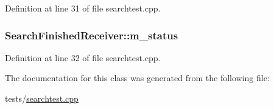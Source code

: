 Definition at line 31 of file searchtest.\+cpp.

\hypertarget{classSearchFinishedReceiver_a5a75af4e271846a79fc5a79c8452ed75}{
\subsubsection[{m\+\_\+status}]{ Search\+Finished\+Receiver\+::m\+\_\+status}}\label{classSearchFinishedReceiver_a5a75af4e271846a79fc5a79c8452ed75}


Definition at line 32 of file searchtest.\+cpp.



The documentation for this class was generated from the following file\+:\begin{DoxyCompactItemize}
\item 
tests/\hyperlink{searchtest_8cpp}{searchtest.\+cpp}\end{DoxyCompactItemize}
